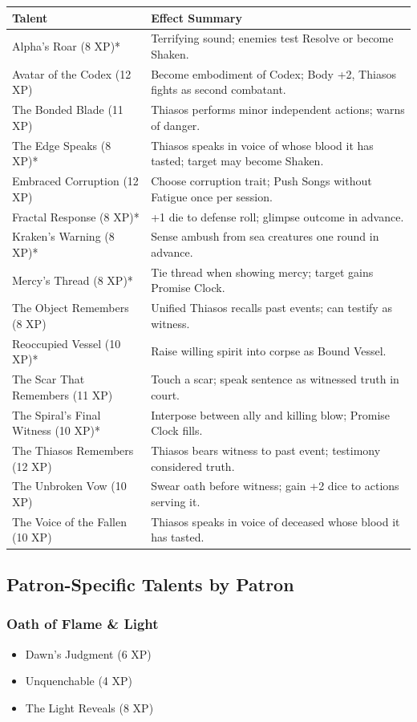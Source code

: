 \begin{longtable}{p{} p{}}
\hline
\textbf{Talent} & \textbf{Effect Summary} \\
\hline
Alpha's Roar (8 XP)* & Terrifying sound; enemies test Resolve or become Shaken. \\
Avatar of the Codex (12 XP) & Become embodiment of Codex; Body +2, Thiasos fights as second combatant. \\
The Bonded Blade (11 XP) & Thiasos performs minor independent actions; warns of danger. \\
The Edge Speaks (8 XP)* & Thiasos speaks in voice of whose blood it has tasted; target may become Shaken. \\
Embraced Corruption (12 XP) & Choose corruption trait; Push Songs without Fatigue once per session. \\
Fractal Response (8 XP)* & +1 die to defense roll; glimpse outcome in advance. \\
Kraken's Warning (8 XP)* & Sense ambush from sea creatures one round in advance. \\
Mercy's Thread (8 XP)* & Tie thread when showing mercy; target gains Promise Clock. \\
The Object Remembers (8 XP) & Unified Thiasos recalls past events; can testify as witness. \\
Reoccupied Vessel (10 XP)* & Raise willing spirit into corpse as Bound Vessel. \\
The Scar That Remembers (11 XP) & Touch a scar; speak sentence as witnessed truth in court. \\
The Spiral's Final Witness (10 XP)* & Interpose between ally and killing blow; Promise Clock fills. \\
The Thiasos Remembers (12 XP) & Thiasos bears witness to past event; testimony considered truth. \\
The Unbroken Vow (10 XP) & Swear oath before witness; gain +2 dice to actions serving it. \\
The Voice of the Fallen (10 XP) & Thiasos speaks in voice of deceased whose blood it has tasted. \\
\hline
\end{longtable}

\subsection{Patron-Specific Talents by Patron}

\subsubsection{Oath of Flame \& Light}
\begin{itemize}
\item Dawn's Judgment (6 XP)
\item Unquenchable (4 XP)
\item The Light Reveals (8 XP)
\end{itemize}

